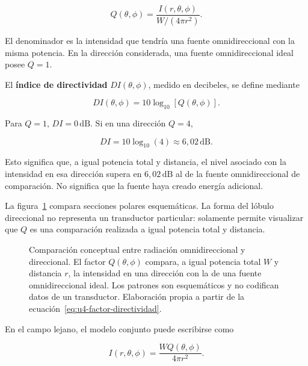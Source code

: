 \begin{equation}
    Q(\theta,\phi)
      =\frac{I(r,\theta,\phi)}
             {W/(4\pi r^2)}.
    \label{eq:u4-factor-directividad}
\end{equation}

El denominador es la intensidad que tendría una fuente omnidireccional con la
misma potencia. En la dirección considerada, una fuente omnidireccional ideal
posee \(Q=1\).

El \textbf{índice de directividad} \(DI(\theta,\phi)\), medido en decibeles, se
define mediante

\begin{equation}
    DI(\theta,\phi)
      =10\log_{10}\!\left[Q(\theta,\phi)\right].
    \label{eq:u4-indice-directividad}
\end{equation}

Para \(Q=1\), \(DI=0\,\text{dB}\). Si en una dirección \(Q=4\),
\nopagebreak[4]

\[
    DI=10\log_{10}(4)\approx6{,}02\,\text{dB}.
\]

Esto significa que, a igual potencia total y distancia, el nivel asociado con
la intensidad en esa dirección supera en \(6{,}02\,\text{dB}\) al de la
fuente omnidireccional de comparación. No significa que la fuente haya creado
energía adicional.

La figura~\ref{fig:u4-directividad-q} compara secciones polares esquemáticas.
La forma del lóbulo direccional no representa un transductor particular:
solamente permite visualizar que \(Q\) es una comparación realizada a igual
potencia total y distancia.

\begin{figure}[htbp]
    \centering
    
    \caption{Comparación conceptual entre radiación omnidireccional y
    direccional. El factor \(Q(\theta,\phi)\) compara, a igual potencia total
    \(W\) y distancia \(r\), la intensidad en una dirección con la de una
    fuente omnidireccional ideal. Los patrones son esquemáticos y no codifican
    datos de un transductor. Elaboración propia a partir de la
    ecuación~\eqref{eq:u4-factor-directividad}.}
    \label{fig:u4-directividad-q}
\end{figure}

En el campo lejano, el modelo conjunto puede escribirse como

\begin{equation}
    I(r,\theta,\phi)
      =\frac{WQ(\theta,\phi)}{4\pi r^2}.
    \label{eq:u4-intensidad-directividad}
\end{equation}


